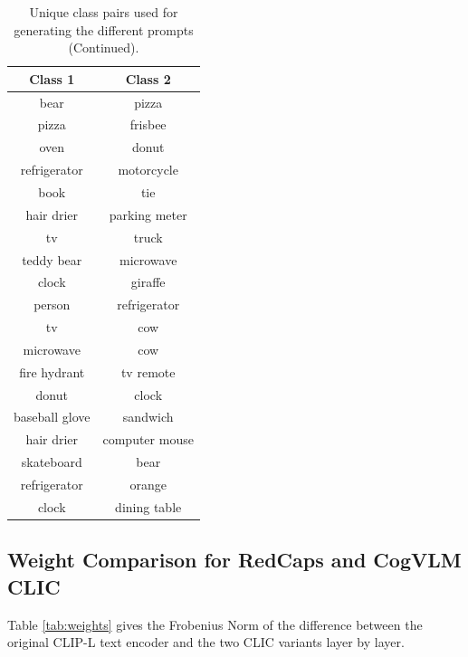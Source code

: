 \begin{table}
\centering
\begin{tabular}{cc}
\toprule
Class 1 & Class 2 \\
\midrule
bear & pizza \\
pizza & frisbee \\
oven & donut \\
refrigerator & motorcycle \\
book & tie \\
hair drier & parking meter \\
tv & truck \\
teddy bear & microwave \\
clock & giraffe \\
person & refrigerator \\
tv & cow \\
microwave & cow \\
fire hydrant & tv remote \\
donut & clock \\
baseball glove & sandwich \\
hair drier & computer mouse \\
skateboard & bear \\
refrigerator & orange \\
clock & dining table \\
\bottomrule
\end{tabular}
\caption{Unique class pairs used for generating the different prompts (Continued).}
\label{tab:class_pairs_3}
\end{table}





\subsection{Weight Comparison for RedCaps and CogVLM CLIC}\label{sec:weights}
Table \ref{tab:weights} gives the Frobenius Norm of the difference between the original CLIP-L text encoder and the two CLIC variants layer by layer.

